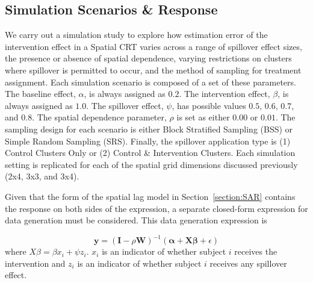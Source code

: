 \documentclass{article}[11pt]
\begin{document}
\subsection{Simulation Scenarios \& Response}

We carry out a simulation study to explore how estimation error of the intervention effect in a Spatial CRT varies across a range of spillover effect sizes, the presence or absence of spatial dependence, varying restrictions on clusters where spillover is permitted to occur, and the method of sampling for treatment assignment. Each simulation scenario is composed of a set of these parameters. The baseline effect, $\alpha$, is always assigned as $0.2$. The intervention effect, $\beta$, is always assigned as $1.0$. The spillover effect, $\psi$, has possible values $0.5$, $0.6$, $0.7$, and $0.8$. The spatial dependence parameter, $\rho$ is set as either $0.00$ or $0.01$. The sampling design for each scenario is either Block Stratified Sampling (BSS) or Simple Random Sampling (SRS). Finally, the spillover application type is (1) Control Clusters Only or (2) Control \& Intervention Clusters. Each simulation setting is replicated for each of the spatial grid dimensions discussed previously (2x4, 3x3, and 3x4).

Given that the form of the spatial lag model in Section~\ref{section:SAR} contains the response on both sides of the expression, a separate closed-form expression for data generation must be considered\cite{fotheringham_sage_2009}\cite{baltagi_spatial_2003}. This data generation expression is

\begin{equation}
    \mathbf{y} = \left(\mathbf{I}-\rho \mathbf{W}\right)^{-1}\left(\boldsymbol\alpha + \mathbf{X}\boldsymbol\beta + \epsilon\right)
\end{equation}
where $X\beta = \beta x_i + \psi z_i$. $x_i$ is an indicator of whether subject $i$ receives the intervention and $z_i$ is an indicator of whether subject $i$ receives any spillover effect.
\end{document}
